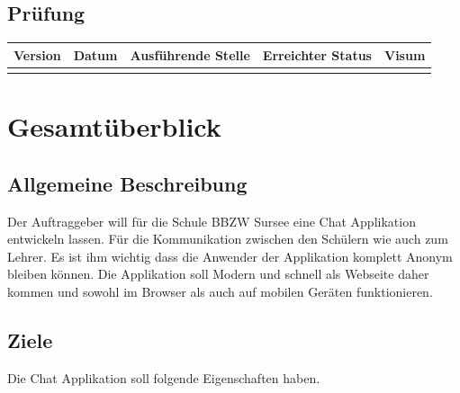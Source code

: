 \documentclass[12pt]{article}
\begin{document}
  \subsection{Prüfung}
    \begin{table}[h]
      \begin{tabularx}{\textwidth}{|l|l|l|X|l|}
        \hline
        \textbf{Version} & \textbf{Datum} & \textbf{Ausführende Stelle}   & \textbf{Erreichter Status}  & \textbf{Visum}  \\ \hline
                         &                &                               &                             &                 \\ \hline
      \end{tabularx}
    \end{table}

  \newpage
  \tableofcontents
  \newpage



  \section{Gesamtüberblick}
    \subsection{Allgemeine Beschreibung}
      Der Auftraggeber will für die Schule BBZW Sursee eine Chat Applikation entwickeln lassen.
      Für die Kommunikation zwischen den Schülern wie auch zum Lehrer. Es ist ihm wichtig dass
      die Anwender der Applikation komplett Anonym bleiben können. Die Applikation soll
      Modern und schnell als Webseite daher kommen und sowohl im Browser als auch
      auf mobilen Geräten funktionieren.

    \subsection{Ziele}
      Die Chat Applikation soll folgende Eigenschaften haben.
\end{document}
